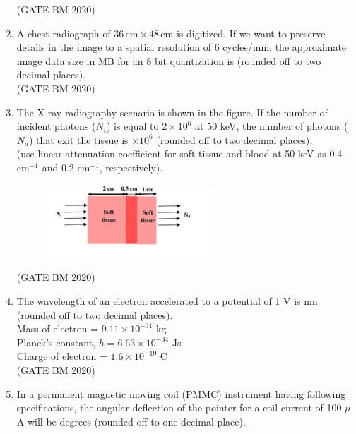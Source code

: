 \documentclass[journal]{IEEEtran}
\begin{document}
\begin{enumerate}
\hfill(GATE BM 2020)
\item A chest radiograph of $36 \,\text{cm} \times 48 \,\text{cm}$ is digitized. If we want to preserve details in the image to a spatial resolution of $6$ cycles/mm, the approximate image data size in MB for an 8 bit quantization is \underline{\hspace{3cm}} (rounded off to two decimal places). \\


	\hfill(GATE BM 2020)
\item The X-ray radiography scenario is shown in the figure. If the number of incident photons ($N_i$) is equal to $2 \times 10^6$ at 50 keV, the number of photons ($N_d$) that exit the tissue is \underline{\hspace{3cm}} $\times 10^6$ (rounded off to two decimal places). \\

(use linear attenuation coefficient for soft tissue and blood at 50 keV as 0.4 cm$^{-1}$ and 0.2 cm$^{-1}$, respectively).


    \begin{figure}[H]
    \centering
\includegraphics[width=0.6\textwidth]{Screenshot_2025_0822_165154.png}
\caption{}
    \label{fig:Q60}
\end{figure}


\hfill(GATE BM 2020)


\item The wavelength of an electron accelerated to a potential of 1 V is \underline{\hspace{3cm}} nm (rounded off to two decimal places). \\
Mass of electron = $9.11 \times 10^{-31}$ kg \\
Planck’s constant, $h = 6.63 \times 10^{-34}$ Js \\
Charge of electron = $1.6 \times 10^{-19}$ C \\


\hfill(GATE BM 2020)
\item In a permanent magnetic moving coil (PMMC) instrument having following specifications, the angular deflection of the pointer for a coil current of 100 $\mu$A will be \underline{\hspace{3cm}} degrees (rounded off to one decimal place). \\


\end{enumerate}
\end{document}
